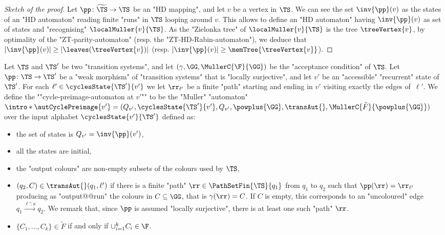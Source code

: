 \documentclass[10pt,a4paper]{amsart}
\renewcommand{\gg}{\gamma}
\newcommand{\re}[1]{\xrightarrow{#1}}
\begin{document}
\begin{proof}[Sketch of the proof]
	Let $\pp\colon \widetilde{\TS}\to \TS$ be an "HD mapping", and let $v$ be a vertex in $\TS$. We can see the set $\inv{\pp}(v)$ as the states of an "HD automaton" reading finite "runs" in $\TS$ looping around $v$. This allows to define an "HD automaton" having $\inv{\pp}(v)$ as set of states and "recognising" $\localMuller{v}{\TS}$. As the "Zielonka tree" of $\localMuller{v}{\TS}$ is the tree $\treeVertex{v}$, by optimality of the "ZT-parity-automaton" (resp. the "ZT-HD-Rabin-automaton"), we deduce that $|\inv{\pp}(v)|\geq |\leaves(\treeVertex{v})|$ (resp. $|\inv{\pp}(v)|\geq \memTree{\treeVertex{v}}$).
\end{proof}

\begin{definition}\label{def:cycle-preimage-automaton}
	Let $\TS$ and $\TS'$ be two "transition systems", and let $(\gg, \GG, \MullerC{\F}{\GG})$ be the "acceptance condition" of $\TS$.
	Let $\pp \colon \TS \to \TS'$ be a "weak morphism" of  "transition systems" that is "locally surjective", and let $v'$ be an "accessible" "recurrent" state of $\TS'$. 
	For each $\ell' \in \cyclesState{\TS'}{v'}$ we let $\rr_{\ell'}$ be a finite "path" starting and ending in $v'$ visiting exactly the edges of~$\ell'$.
	\AP We define the ""cycle-preimage-automaton at $v'$"" to be the "Muller" "automaton" $\intro*\autCyclePreimage{v'} = (Q_{v'}, \cyclesState{\TS'}{v'}, Q_{v'}, \powplus{\GG}, \transAut{}, \MullerC{\tilde{F}}{\powplus{\GG}})$ over the input alphabet $\cyclesState{v'}{\TS'}$ defined as:
	\begin{itemize}
		\item the set of states is $Q_{v'} = \inv{\pp}(v')$,
		\item all the states are initial,
		\item the "output colours" are non-empty subsets of the colours used by $\TS$,
		\item $(q_2, C)\in \transAut{}(q_1,\ell')$  if there is a finite "path" $\rr \in \PathSetFin{\TS}{q_1}$ from $q_1$ to $q_2$ such that $\pp(\rr) = \rr_{\ell'}$ producing as "output@@run" the colours in $C\subseteq \GG$, that is $\gg(\rr) = C$. If $C$ is empty, this corresponds to an "uncoloured" edge $q_1\re{\ell':\ee}q_2$.
		We remark that, since $\pp$ is assumed "locally surjective", there is at least one such "path" $\rr$.
		\item $\{C_1,\dots, C_k\} \in \tilde{F}$ if and only if $\cup_{i=1}^k C_i \in \F$.
	\end{itemize}
\end{definition}
\end{document}
